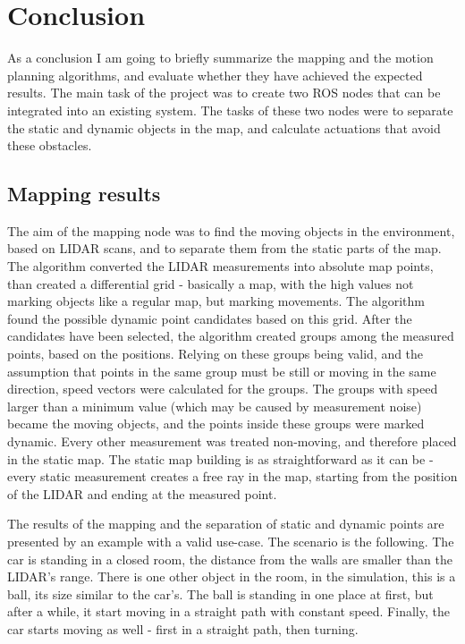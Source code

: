 \chapter{Conclusion}
\label{chap:conclusion}

As a conclusion I am going to briefly summarize the mapping and the motion planning algorithms, and evaluate whether they have achieved the expected results. The main task of the project was to create two ROS nodes that can be integrated into an existing system. The tasks of these two nodes were to separate the static and dynamic objects in the map, and calculate actuations that avoid these obstacles.

\section{Mapping results}
The aim of the mapping node was to find the moving objects in the environment, based on LIDAR scans, and to separate them from the static parts of the map. The algorithm converted the LIDAR measurements into absolute map points, than created a differential grid - basically a map, with the high values not marking objects like a regular map, but marking movements. The algorithm found the possible dynamic point candidates based on this grid. After the candidates have been selected, the algorithm created groups among the measured points, based on the positions. Relying on these groups being valid, and the assumption that points in the same group must be still or moving in the same direction, speed vectors were calculated for the groups. The groups with speed larger than a minimum value (which may be caused by measurement noise) became the moving objects, and the points inside these groups were marked dynamic. Every other measurement was treated non-moving, and therefore placed in the static map. The static map building is as straightforward as it can be - every static measurement creates a free ray in the map, starting from the position of the LIDAR and ending at the measured point.

The results of the mapping and the separation of static and dynamic points are presented by an example with a valid use-case. The scenario is the following. The car is standing in a closed room, the distance from the walls are smaller than the LIDAR's range. There is one other object in the room, in the simulation, this is a ball, its size similar to the car's. The ball is standing in one place at first, but after a while, it start moving in a straight path with constant speed. Finally, the car starts moving as well - first in a straight path, then turning.

